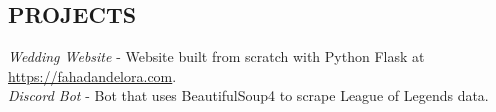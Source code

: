 \documentclass[margin, 10pt]{res} %
\begin{document}
\begin{resume}
\section{PROJECTS}

{\sl Wedding Website} - Website built from scratch with Python Flask at \url{https://fahadandelora.com}. \\
{\sl Discord Bot} - Bot that uses BeautifulSoup4 to scrape League of Legends data.



\end{resume}
\end{document}

